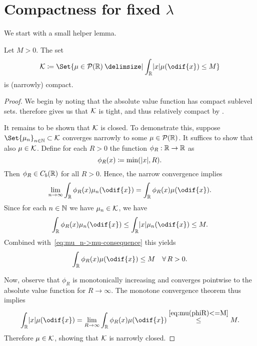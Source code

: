 \section{Compactness for fixed \texorpdfstring{\( \lambda \)}{lambda}}


We start with a small helper lemma.

\begin{lemma}\label{lem:K-set-compact}
  Let \( M > 0 \).
  The set
  \begin{equation}
    \cK \coloneqq \Set{ \mu \in \cP(\bR) \given \int_\bR \abs{x} \mu(\odif{x}) \leq M }
  \end{equation}
  is (narrowly) compact.
\end{lemma}

\begin{proof}
  We begin by noting that the absolute value function has compact sublevel sets.
   therefore gives us that \( \mathcal{K} \) is tight, and thus relatively compact by .

  It remains to be shown that \( \mathcal{K} \) is closed.
  To demonstrate this, suppose \( \Set{\mu_n}_{n\in\bN} \subset \cK \) converges narrowly to some \( \mu \in \mathcal{P}(\mathbb{R}) \).
  It suffices to show that also \( \mu \in \mathcal{K} \).
  Define for each \( R > 0 \) the function \( \phi_R : \mathbb{R} \to \mathbb{R} \) as
  \begin{equation}
    \phi_R(x) \coloneqq \min(\lvert x\rvert, R).
  \end{equation}
  Then \( \phi_R \in C_b(\mathbb{R}) \) for all \( R > 0 \).
  Hence, the narrow convergence implies
  \begin{equation}\label{eq:mu_n->mu-consequence}
    \lim_{n\to\infty} \int_\bR \phi_R(x) \mu_n(\odif{x}) = \int_\bR \phi_R(x) \mu(\odif{x}).
  \end{equation}
  Since for each \( n \in \mathbb{N} \) we have \( \mu_n \in \mathcal{K} \), we have
  \begin{equation}
    \int_\bR \phi_R(x) \mu_n(\odif{x}) \leq \int_\bR \abs{x} \mu_n(\odif{x}) \leq M.
  \end{equation}
  Combined with~\eqref{eq:mu_n->mu-consequence} this yields
  \begin{equation}\label{eq:mu(phiR)<=M}
    \int_\bR \phi_R(x) \mu(\odif{x}) \leq M \quad \forall R > 0.
  \end{equation}

  Now, observe that \( \phi_R \) is monotonically increasing and converges pointwise to the absolute value function for \( R \to \infty \).
  The monotone convergence theorem thus implies
  \begin{equation}
    \int_\bR \abs{x} \mu(\odif{x})
    = \lim_{R\to\infty} \int_\bR \phi_R(x) \mu(\odif{x})
    \overset{\eqref{eq:mu(phiR)<=M}}{\leq} M.
  \end{equation}
  Therefore \( \mu \in \mathcal{K} \), showing that \( \mathcal{K} \) is narrowly closed.
\end{proof}

